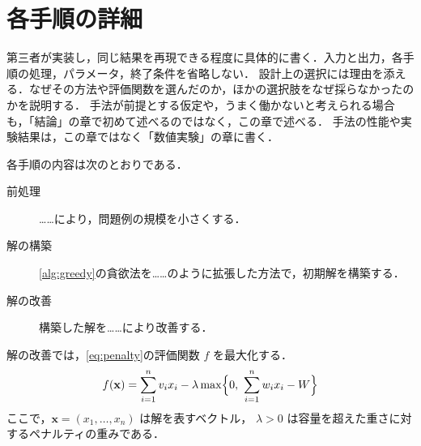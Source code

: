 \section{各手順の詳細}
\label{sec:procedure}

\begin{writingnote}
第三者が実装し，同じ結果を再現できる程度に具体的に書く．入力と出力，各手順の処理，パラメータ，終了条件を省略しない．
設計上の選択には理由を添える．なぜその方法や評価関数を選んだのか，ほかの選択肢をなぜ採らなかったのかを説明する．
手法が前提とする仮定や，うまく働かないと考えられる場合も，「結論」の章で初めて述べるのではなく，この章で述べる．
手法の性能や実験結果は，この章ではなく「数値実験」の章に書く．
\end{writingnote}

各手順の内容は次のとおりである．
\begin{description}
  \item[前処理] ……により，問題例の規模を小さくする．
  \item[解の構築] \cref{alg:greedy}の貪欲法を……のように拡張した方法で，初期解を構築する．
  \item[解の改善] 構築した解を……により改善する．
\end{description}

解の改善では，\cref{eq:penalty}の評価関数 $f$ を最大化する．
\begin{equation}
  f(\mathbf{x}) = \sum_{i=1}^{n} v_i x_i - \lambda \max\Bigl\{ 0,\ \sum_{i=1}^{n} w_i x_i - W \Bigr\}
  \label{eq:penalty}
\end{equation}
ここで，$\mathbf{x} = (x_1, \dots, x_n)$ は解を表すベクトル，
$\lambda > 0$ は容量を超えた重さに対するペナルティの重みである．

